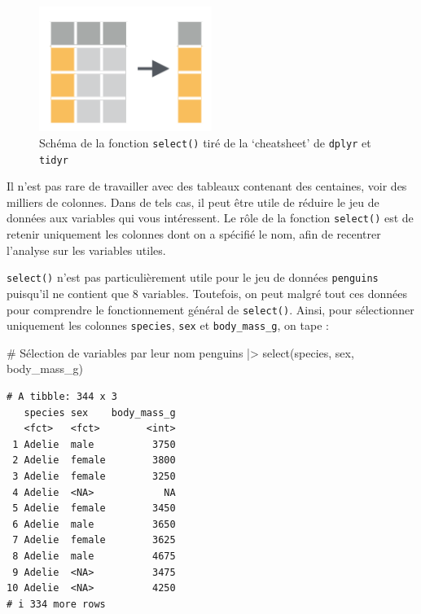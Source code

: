 \documentclass[
  a4paper,
  DIV=11,
  numbers=noendperiod,
  oneside]{scrreprt}
\newenvironment{Shaded}{}{}
\newcommand{\CommentTok}[1]{\textcolor[rgb]{0.42,0.45,0.49}{#1}}
\newcommand{\FunctionTok}[1]{\textcolor[rgb]{0.44,0.26,0.76}{#1}}
\newcommand{\NormalTok}[1]{\textcolor[rgb]{0.14,0.16,0.18}{#1}}
\newcommand{\SpecialCharTok}[1]{\textcolor[rgb]{0.00,0.36,0.77}{#1}}
\begin{document}
\begin{figure}[H]

{\centering \includegraphics[width=0.5\textwidth,height=\textheight]{images/select.png}

}

\caption{Schéma de la fonction \texttt{select()} tiré de la `cheatsheet'
de \texttt{dplyr} et \texttt{tidyr}}

\end{figure}%

Il n'est pas rare de travailler avec des tableaux contenant des
centaines, voir des milliers de colonnes. Dans de tels cas, il peut être
utile de réduire le jeu de données aux variables qui vous intéressent.
Le rôle de la fonction \texttt{select()} est de retenir uniquement les
colonnes dont on a spécifié le nom, afin de recentrer l'analyse sur les
variables utiles.

\texttt{select()} n'est pas particulièrement utile pour le jeu de
données \texttt{penguins} puisqu'il ne contient que 8 variables.
Toutefois, on peut malgré tout ces données pour comprendre le
fonctionnement général de \texttt{select()}. Ainsi, pour sélectionner
uniquement les colonnes \texttt{species}, \texttt{sex} et
\texttt{body\_mass\_g}, on tape :

\begin{Shaded}
\begin{Highlighting}[]
\CommentTok{\# Sélection de variables par leur nom}
\NormalTok{penguins }\SpecialCharTok{|\textgreater{}}
  \FunctionTok{select}\NormalTok{(species, sex, body\_mass\_g)}
\end{Highlighting}
\end{Shaded}

\begin{verbatim}
# A tibble: 344 x 3
   species sex    body_mass_g
   <fct>   <fct>        <int>
 1 Adelie  male          3750
 2 Adelie  female        3800
 3 Adelie  female        3250
 4 Adelie  <NA>            NA
 5 Adelie  female        3450
 6 Adelie  male          3650
 7 Adelie  female        3625
 8 Adelie  male          4675
 9 Adelie  <NA>          3475
10 Adelie  <NA>          4250
# i 334 more rows
\end{verbatim}
\end{document}

